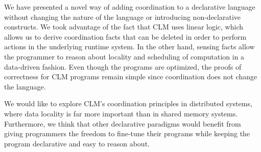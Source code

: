 We have presented a novel way of adding coordination to a declarative language without
changing the nature of the language or introducing non-declarative constructs. We
took advantage of the fact that CLM uses linear logic, which allows us to derive
coordination facts that can be deleted in order to perform actions in the underlying
runtime system. In the other hand, sensing facts allow the programmer to reason
about locality and scheduling of computation in a data-driven fashion.
Even though the programs are optimized, the proofs of correctness for CLM
programs remain simple since coordination does not change the language.

We would like to explore CLM's coordination principles in distributed systems,
where data locality is far more important than in shared memory systems.
Furthermore, we think that other declarative paradigms would benefit
from giving programmers the freedom to fine-tune their programs while keeping
the program declarative and easy to reason about.
